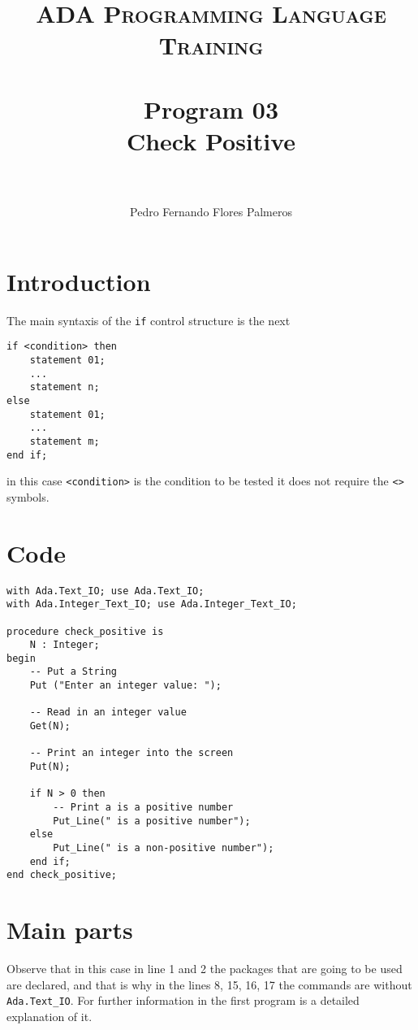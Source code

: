 \documentclass[paper=a4, fontsize=11pt]{scrartcl} %
\title{	
\normalfont \normalsize 
\textsc{ADA Programming Language Training} \\ [25pt] %
\horrule{0.5pt} \\[0.4cm] %
\huge Program 03\\ Check Positive \\ %
\horrule{2pt} \\[0.5cm] %
}
\author{Pedro Fernando Flores Palmeros} %
\date{} %
\numberwithin{equation}{section} %
\numberwithin{figure}{section} %
\numberwithin{table}{section} %
\begin{document}
\maketitle %
 

\section{Introduction}
The main syntaxis of the \verb|if| control structure is the next

\begin{lstlisting}
if <condition> then
	statement 01;
	...
	statement n;
else
	statement 01;
	...
	statement m;
end if;
\end{lstlisting}
in this case \verb|<condition>| is the condition to be tested it does not require the \verb|<>| symbols.

\section{Code}
\begin{lstlisting}
with Ada.Text_IO; use Ada.Text_IO;
with Ada.Integer_Text_IO; use Ada.Integer_Text_IO;

procedure check_positive is 
    N : Integer;
begin
    -- Put a String
    Put ("Enter an integer value: ");

    -- Read in an integer value
    Get(N);

    -- Print an integer into the screen
    Put(N);

    if N > 0 then
        -- Print a is a positive number
        Put_Line(" is a positive number");
    else
        Put_Line(" is a non-positive number");
    end if;
end check_positive;

\end{lstlisting}

\section{Main parts}
Observe that in this case in line 1 and 2 the packages that are going to be used are declared, and that is why in the lines 8, 15, 16, 17 the commands are without \verb|Ada.Text_IO|. For further information in the first program is a detailed explanation of it. 
\end{document}

